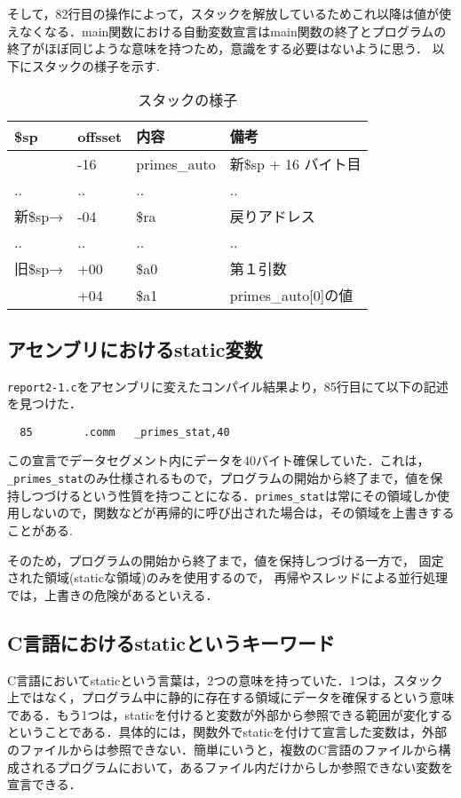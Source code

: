\documentclass[a4j,11pt]{jarticle}
\begin{document}
そして，82行目の操作によって，スタックを解放しているためこれ以降は値が使えなくなる．main関数における自動変数宣言はmain関数の終了とプログラムの終了がほぼ同じような意味を持つため，意識をする必要はないように思う．
以下にスタックの様子を示す.
\begin{table}[htb]
  \label{tab:stack2}
  \centering
  \begin{tabular}{|l|l|l|l|}
  \hline
  \$sp   & offsset & 内容           & 備考                    \\ \hline
         & -16     & primes\_auto & 新\$sp + 16 バイト目       \\ \hline
  ..     & ..      & ..           & ..                    \\ \hline
  新\$sp→ & -04     & \$ra         & 戻りアドレス                \\ \hline
  ..     & ..      & ..           & ..                    \\ \hline
  旧\$sp→ & +00     & \$a0         & 第１引数                  \\ \hline
         & +04     & \$a1         & primes\_auto{[}0{]}の値 \\ \hline
  \end{tabular}
  \caption{スタックの様子}
  \end{table}

\subsection{アセンブリにおけるstatic変数}
\verb|report2-1.c|をアセンブリに変えたコンパイル結果より，85行目にて以下の記述を見つけた．
\begin{verbatim}
  85		.comm	_primes_stat,40
\end{verbatim}
この宣言でデータセグメント内にデータを40バイト確保していた．これは，\verb|_primes_stat|のみ仕様されるもので，プログラムの開始から終了まで，値を保持しつづけるという性質を持つことになる．\verb|primes_stat|は常にその領域しか使用しないので，関数などが再帰的に呼び出された場合は，その領域を上書きすることがある.

そのため，プログラムの開始から終了まで，値を保持しつづける一方で， 固定された領域(staticな領域)のみを使用するので， 再帰やスレッドによる並行処理では，上書きの危険があるといえる．

\subsection{C言語におけるstaticというキーワード}
C言語においてstaticという言葉は，2つの意味を持っていた．1つは，スタック上ではなく，プログラム中に静的に存在する領域にデータを確保するという意味である．もう1つは，staticを付けると変数が外部から参照できる範囲が変化するということである．具体的には，関数外でstaticを付けて宣言した変数は，外部のファイルからは参照できない．簡単にいうと，複数のC言語のファイルから構成されるプログラムにおいて，あるファイル内だけからしか参照できない変数を宣言できる．
\end{document}
